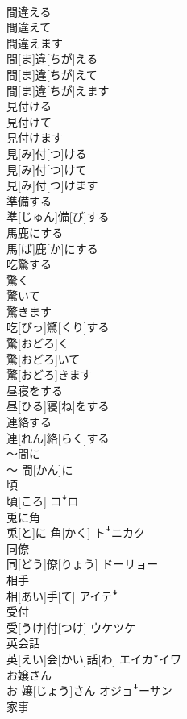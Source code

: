 \documentclass[8pt]{extreport}
\begin{document}
\begin{CJK}{UTF8}{min}
\\	間違える 
\\	間違えて 
\\	間違えます	
\\	間[ま]違[ちが]える 
\\	間[ま]違[ちが]えて 
\\	間[ま]違[ちが]えます	
\\	見付ける 
\\	見付けて 
\\	見付けます	
\\	見[み]付[つ]ける 
\\	見[み]付[つ]けて 
\\	見[み]付[つ]けます	
\\	準備する	
\\	準[じゅん]備[び]する	
\\	馬鹿にする	
\\	馬[ば]鹿[か]にする	
\\	吃驚する 
\\	驚く 
\\	驚いて 
\\	驚きます	
\\	吃[びっ]驚[くり]する 
\\	驚[おどろ]く 
\\	驚[おどろ]いて 
\\	驚[おどろ]きます	
\\	昼寝をする	
\\	昼[ひる]寝[ね]をする	
\\	連絡する	
\\	連[れん]絡[らく]する	
\\	〜間に	
\\	〜 間[かん]に	
\\	頃	
\\	頃[ころ]	コꜜロ
\\	兎に角	
\\	兎[と]に 角[かく]	トꜜニカク
\\	同僚	
\\	同[どう]僚[りょう]	ドーリョー
\\	相手	
\\	相[あい]手[て]	アイテꜜ
\\	受付	
\\	受[うけ]付[つけ]	ウケツケ
\\	英会話	
\\	英[えい]会[かい]話[わ]	エイカꜜイワ
\\	お嬢さん	
\\	お 嬢[じょう]さん	オジョꜜーサン
\\	家事	

\end{CJK}
\end{document}
